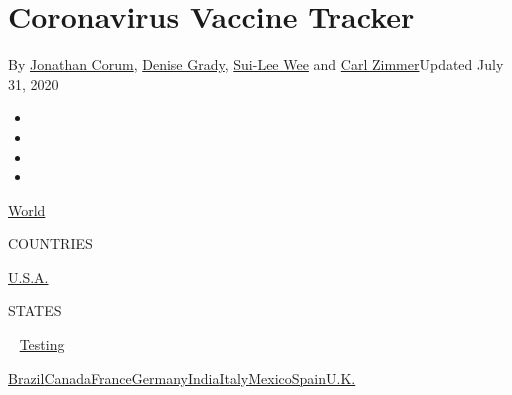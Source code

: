 \hypertarget{coronavirus-vaccine-tracker}{%
\section{Coronavirus Vaccine
Tracker}\label{coronavirus-vaccine-tracker}}

By \href{https://www.nytimes3xbfgragh.onion/by/jonathan-corum}{Jonathan
Corum}, \href{https://www.nytimes3xbfgragh.onion/by/denise-grady}{Denise
Grady}, \href{https://www.nytimes3xbfgragh.onion/by/sui-lee-wee}{Sui-Lee
Wee} and \href{https://www.nytimes3xbfgragh.onion/by/carl-zimmer}{Carl
Zimmer}Updated July 31, 2020

\begin{itemize}
\item
\item
\item
\item
\end{itemize}

\href{https://www.nytimes3xbfgragh.onion/interactive/2020/world/coronavirus-maps.html}{World}~

COUNTRIES

\textbar{}
\href{https://www.nytimes3xbfgragh.onion/interactive/2020/us/coronavirus-us-cases.html}{U.S.A.}~

STATES

~
\href{https://www.nytimes3xbfgragh.onion/interactive/2020/us/coronavirus-testing.html}{Testing}

\href{https://www.nytimes3xbfgragh.onion/interactive/2020/world/americas/brazil-coronavirus-cases.html}{Brazil}\href{https://www.nytimes3xbfgragh.onion/interactive/2020/world/canada/canada-coronavirus-cases.html}{Canada}\href{https://www.nytimes3xbfgragh.onion/interactive/2020/world/europe/france-coronavirus-cases.html}{France}\href{https://www.nytimes3xbfgragh.onion/interactive/2020/world/europe/germany-coronavirus-cases.html}{Germany}\href{https://www.nytimes3xbfgragh.onion/interactive/2020/world/asia/india-coronavirus-cases.html}{India}\href{https://www.nytimes3xbfgragh.onion/interactive/2020/world/europe/italy-coronavirus-cases.html}{Italy}\href{https://www.nytimes3xbfgragh.onion/interactive/2020/world/americas/mexico-coronavirus-cases.html}{Mexico}\href{https://www.nytimes3xbfgragh.onion/interactive/2020/world/europe/spain-coronavirus-cases.html}{Spain}\href{https://www.nytimes3xbfgragh.onion/interactive/2020/world/europe/united-kingdom-coronavirus-cases.html}{U.K.}

